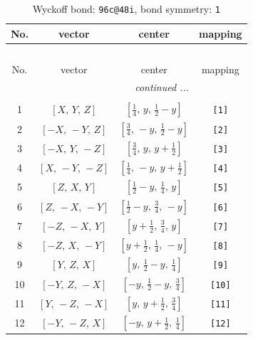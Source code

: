 \documentclass[fleqn,8pt]{jsarticle}
\begin{document}
\begin{longtable}{cccc}
\caption{Wyckoff bond: {\tt 96c@48i}, bond symmetry: {\tt 1}}
 \\
 \hline \hline
No. & vector & center & mapping \\ \hline \endfirsthead

\multicolumn{3}{l}{\tablename\ \thetable{}} \\
 \hline \hline
No. & vector & center & mapping \\ \hline \endhead

 \hline \hline
\multicolumn{3}{r}{\footnotesize\it continued ...} \\ \endfoot

 \hline \hline
\multicolumn{3}{r}{} \\ \endlastfoot

1 & $\left[ X,\, Y,\, Z \right]$ & $\left[ \frac{1}{4},\, y,\, \frac{1}{2} - y \right]$ & {\tt [1]} \\ \hline
2 & $\left[ - X,\, - Y,\, Z \right]$ & $\left[ \frac{3}{4},\, - y,\, \frac{1}{2} - y \right]$ & {\tt [2]} \\ \hline
3 & $\left[ - X,\, Y,\, - Z \right]$ & $\left[ \frac{3}{4},\, y,\, y + \frac{1}{2} \right]$ & {\tt [3]} \\ \hline
4 & $\left[ X,\, - Y,\, - Z \right]$ & $\left[ \frac{1}{4},\, - y,\, y + \frac{1}{2} \right]$ & {\tt [4]} \\ \hline
5 & $\left[ Z,\, X,\, Y \right]$ & $\left[ \frac{1}{2} - y,\, \frac{1}{4},\, y \right]$ & {\tt [5]} \\ \hline
6 & $\left[ Z,\, - X,\, - Y \right]$ & $\left[ \frac{1}{2} - y,\, \frac{3}{4},\, - y \right]$ & {\tt [6]} \\ \hline
7 & $\left[ - Z,\, - X,\, Y \right]$ & $\left[ y + \frac{1}{2},\, \frac{3}{4},\, y \right]$ & {\tt [7]} \\ \hline
8 & $\left[ - Z,\, X,\, - Y \right]$ & $\left[ y + \frac{1}{2},\, \frac{1}{4},\, - y \right]$ & {\tt [8]} \\ \hline
9 & $\left[ Y,\, Z,\, X \right]$ & $\left[ y,\, \frac{1}{2} - y,\, \frac{1}{4} \right]$ & {\tt [9]} \\ \hline
10 & $\left[ - Y,\, Z,\, - X \right]$ & $\left[ - y,\, \frac{1}{2} - y,\, \frac{3}{4} \right]$ & {\tt [10]} \\ \hline
11 & $\left[ Y,\, - Z,\, - X \right]$ & $\left[ y,\, y + \frac{1}{2},\, \frac{3}{4} \right]$ & {\tt [11]} \\ \hline
12 & $\left[ - Y,\, - Z,\, X \right]$ & $\left[ - y,\, y + \frac{1}{2},\, \frac{1}{4} \right]$ & {\tt [12]} \\ \hline

\end{longtable}
\end{document}
